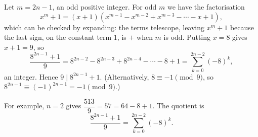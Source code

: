 Let $m=2n-1$, an odd positive integer. For odd $m$ we have the factorisation
\[
x^{m}+1=(x+1)\left(x^{m-1}-x^{m-2}+x^{m-3}-\cdots-x+1\right),
\]
which can be checked by expanding: the terms telescope, leaving $x^m+1$ because the last sign, on the constant term $1$, is $+$ when $m$ is odd. Putting $x=8$ gives $x+1=9$, so
\[
\dfrac{8^{2n-1}+1}{9}=8^{2n-2}-8^{2n-3}+8^{2n-4}-\cdots-8+1=\sum_{k=0}^{2n-2}(-8)^k ,
\]
an integer. Hence $9\mid 8^{2n-1}+1$. (Alternatively, $8\equiv-1\pmod9$, so $8^{2n-1}\equiv(-1)^{2n-1}=-1\pmod9$.)

For example, $n=2$ gives $\dfrac{513}{9}=57=64-8+1$. The quotient is
\[
\boxed{\dfrac{8^{2n-1}+1}{9}=\sum_{k=0}^{2n-2}(-8)^k}.
\]
